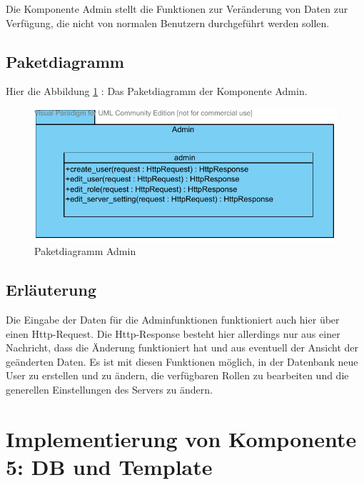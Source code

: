 
Die Komponente Admin stellt die Funktionen zur Veränderung von Daten zur Verfügung,
die nicht von normalen Benutzern durchgeführt werden sollen.

\subsection{Paketdiagramm}
Hier die Abbildung \ref{fig:PDadmin} : Das Paketdiagramm der Komponente Admin.
\begin{figure}[H]
\includegraphics[width=0.8\linewidth]{bilder/Paketdiagramm_admin.pdf}
\caption{Paketdiagramm Admin}
\label{fig:PDadmin}
\end{figure}
\subsection{Erl\"auterung}
Die Eingabe der Daten für die Adminfunktionen funktioniert auch hier über
einen Http-Request. Die Http-Response besteht hier allerdings nur aus einer
Nachricht, dass die Änderung funktioniert hat und aus eventuell der Ansicht der
geänderten Daten. Es ist mit diesen Funktionen möglich, in der Datenbank neue
User zu erstellen und zu ändern, die verfügbaren Rollen zu bearbeiten und die
generellen Einstellungen des Servers zu ändern. 

\section{Implementierung von Komponente
         5: DB und Template}


